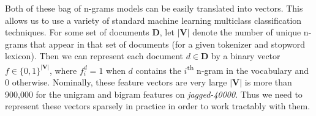 Both of these bag of n-grams models can be easily translated into vectors. This allows us to use a variety of standard machine learning multiclass classification techniques. For some set of documents $\mathbf{D}$, let $| \mathbf{V} |$ denote the number of unique n-grams that appear in that set of documents (for a given tokenizer and stopword lexicon). Then we can represent each document $ d \in \mathbf{D}$ by a binary vector $f \in \{0,1\}^{| \mathbf{V} |}$, where $f^d_i = 1$ when $d$ contains the $i$\textsuperscript{th} n-gram in the vocabulary and 0 otherwise. Nominally, these feature vectors are very large $| \mathbf{V} |$ is more than 900,000 for the unigram and bigram features on \emph{jagged-40000}. Thus we need to represent these vectors sparsely in practice in order to work tractably with them.


